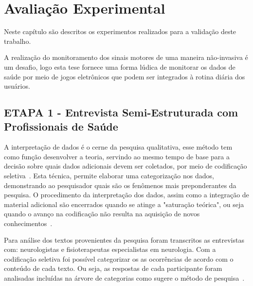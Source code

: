 \chapter{Avalia\c{c}\~{a}o Experimental} \label{chap:avaliacao}
Neste capítulo são descritos os experimentos realizados para a validação deste trabalho.

A realização do monitoramento dos sinais motores de uma maneira não-invasiva é um desafio, logo esta tese fornece uma forma lúdica de monitorar os dados de saúde por meio de jogos eletrônicos que podem ser integrados à rotina diária dos usuários. %





\section{ETAPA 1 - Entrevista Semi-Estruturada com Profissionais de Saúde}\label{chapter:entrevista_semi_estruturada}

A interpretação de dados é o cerne da pesquisa qualitativa, esse método tem como função desenvolver a teoria, servindo ao mesmo tempo de base para a decisão sobre quais dados adicionais devem ser coletados, por meio de codificação seletiva~\cite{FLI04}. Esta técnica, permite elaborar uma categorização nos dados, demonstrando ao pesquisador quais são os fenômenos mais preponderantes da pesquisa. O procedimento da interpretação dos dados, assim como a integração de material adicional são encerrados quando se atinge a "saturação teórica", ou seja quando o avanço na codificação não resulta na aquisição de novos conhecimentos~\cite{FLI04}.

Para análise dos textos provenientes da pesquisa foram transcritos as entrevistas com: neurologistas e fisioterapeutas especialistas em neurologia. Com  a codificação seletiva foi possível categorizar os as ocorrências de acordo com o conteúdo de cada texto. Ou seja, as respostas de cada participante foram analisadas incluídas na árvore de categorias como sugere o método de pesquisa~\cite{FLI04}. 

